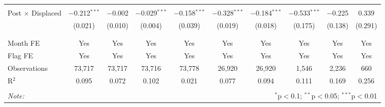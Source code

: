\begin{table}[H]
\begin{tabular}{@{\extracolsep{1pt}}lccccccccc}
  & & & & & & & & & \\ 
 Post $\times$ Displaced & $-$0.212$^{***}$ & $-$0.002 & $-$0.029$^{***}$ & $-$0.158$^{***}$ & $-$0.328$^{***}$ & $-$0.184$^{***}$ & $-$0.533$^{***}$ & $-$0.225 & 0.339 \\ 
  & (0.021) & (0.010) & (0.004) & (0.039) & (0.019) & (0.018) & (0.175) & (0.138) & (0.291) \\ 
  & & & & & & & & & \\ 
\hline \\[-1.8ex] 
Month FE & Yes & Yes & Yes & Yes & Yes & Yes & Yes & Yes & Yes \\ 
Flag FE & Yes & Yes & Yes & Yes & Yes & Yes & Yes & Yes & Yes \\ 
Observations & 73,717 & 73,717 & 73,716 & 73,778 & 26,920 & 26,920 & 1,546 & 2,236 & 660 \\ 
R$^{2}$ & 0.095 & 0.072 & 0.102 & 0.021 & 0.077 & 0.094 & 0.111 & 0.169 & 0.256 \\ 
\hline 
\hline \\[-1.8ex] 
\textit{Note:}  & \multicolumn{9}{r}{$^{*}$p$<$0.1; $^{**}$p$<$0.05; $^{***}$p$<$0.01} \\ 
\end{tabular} 
\end{table} 
